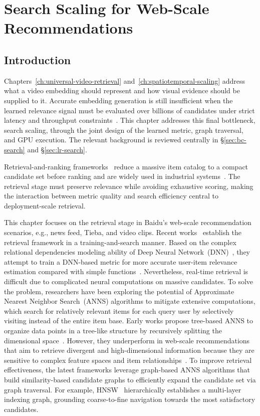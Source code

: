 \chapter{Search Scaling for Web-Scale Recommendations}
\label{ch:scale-efficient-retrieval}

\section{Introduction}

Chapters~\ref{ch:universal-video-retrieval} and~\ref{ch:spatiotemporal-scaling} address what a video embedding should represent and how visual evidence should be supplied to it. Accurate embedding generation is still insufficient when the learned relevance signal must be evaluated over billions of candidates under strict latency and throughput constraints~\cite{zhu2018learning,liu2021jizhi}. This chapter addresses this final bottleneck, search scaling, through the joint design of the learned metric, graph traversal, and GPU execution. The relevant background is reviewed centrally in \S\ref{sec:bc-search} and \S\ref{sec:lr-search}.

Retrieval-and-ranking frameworks~\cite{cheng2016wide,ma2020off} reduce a massive item catalog to a compact candidate set before ranking and are widely used in industrial systems~\cite{covington2016deep,borisyuk2016casmos,eksombatchai2018pixie}. The retrieval stage must preserve relevance while avoiding exhaustive scoring, making the interaction between metric quality and search efficiency central to deployment-scale retrieval.

This chapter focuses on the retrieval stage in Baidu's web-scale recommendation scenarios, e.g., news feed, Tieba, and video clips. Recent works~\cite{tan2020fast,chen2022approximate} establish the retrieval framework in a training-and-search manner.
Based on the complex relational dependencies modeling ability of Deep Neural Network~(DNN)~\cite{zhang2019deep}, they attempt to train a DNN-based metric for more accurate user-item relevance estimation compared with simple functions~\cite{dehghani2017neural,tay2018latent}.
Nevertheless, real-time retrieval is difficult due to complicated neural computations on massive candidates.
To solve the problem, researchers have been exploring the potential of Approximate Nearest Neighbor Search~(ANNS) algorithms to mitigate extensive computations, which search for relatively relevant items for each query user by selectively visiting instead of the entire item base.
Early works propose tree-based ANNS to organize data points in a tree-like structure by recursively splitting the dimensional space~\cite{friedman1977algorithm}.
However, they underperform in web-scale recommendations that aim to retrieve divergent and high-dimensional information because they are sensitive to complex feature spaces and item relationships~\cite{wang2021comprehensive}.
To improve retrieval effectiveness, the latest frameworks leverage graph-based ANNS algorithms that build similarity-based candidate graphs to efficiently expand the candidate set via graph traversal.
For example, HNSW~\cite{malkov2018efficient} hierarchically establishes a multi-layer indexing graph, grounding coarse-to-fine navigation towards the most satisfactory candidates.


